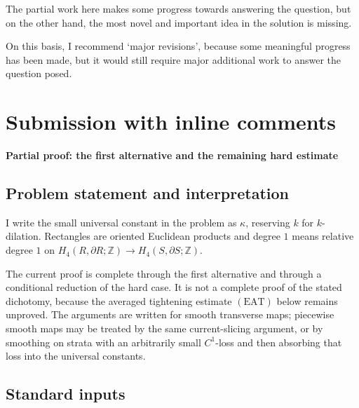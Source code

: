 \documentclass[12pt]{article}
\begin{document}
The partial work here makes some progress towards answering the question, but on the other hand, the most novel and important idea in the solution is missing.

On this basis, I recommend `major revisions', because some meaningful progress has been made, but it would still require major additional work to answer the question posed.



\vskip10pt


  \section{Submission with inline comments}


\date{}


\begin{center}
{\bf Partial proof: the first alternative and the remaining hard estimate}
\end{center}

\subsection*{Problem statement and interpretation}

I write the small universal constant in the problem as \(\kappa\), reserving
\(k\) for \(k\)-dilation.  Rectangles are oriented Euclidean products and
degree \(1\) means relative degree \(1\) on
\(H_4(R,\partial R;\mathbb Z)\to H_4(S,\partial S;\mathbb Z)\).

The current proof is complete through the first alternative and through a
conditional reduction of the hard case.  It is not a complete proof of the
stated dichotomy, because the averaged tightening estimate \((\mathrm{EAT})\)
below remains unproved.  The arguments are written for smooth transverse maps;
piecewise smooth maps may be treated by the same current-slicing argument, or
by smoothing on strata with an arbitrarily small \(C^1\)-loss and then
absorbing that loss into the universal constants.

\subsection*{Standard inputs}
\end{document}
